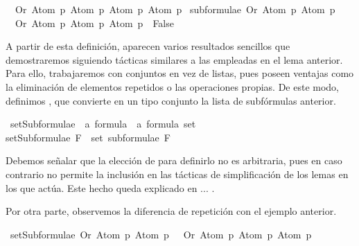 \begin{isabellebody}
\ \ {\isacharbrackleft}Or\ {\isacharparenleft}Atom\ p{\isacharparenright}\ {\isacharparenleft}Atom\ p{\isacharparenright}{\isacharcomma}\ Atom\ p{\isacharcomma}\ Atom\ p{\isacharbrackright}{\isachardoublequoteclose}\isanewline
\isanewline
{}\isamarkupfalse%
\ {\isachardoublequoteopen}subformulae\ {\isacharparenleft}Or\ {\isacharparenleft}Atom\ p{\isacharparenright}\ {\isacharparenleft}Atom\ p{\isacharparenright}{\isacharparenright}\ {\isacharequal}\ \ \isanewline
\ \ {\isacharbrackleft}Or\ {\isacharparenleft}Atom\ p{\isacharparenright}\ {\isacharparenleft}Atom\ p{\isacharparenright}{\isacharcomma}\ Atom\ p{\isacharbrackright}\ {\isacharequal}\ False{\isachardoublequoteclose}%
\begin{isamarkuptext}%
A partir de esta definición, aparecen varios resultados sencillos que demostraremos siguiendo 
tácticas similares a las empleadas en el lema anterior. Para ello, trabajaremos
con conjuntos en vez de listas, pues poseen ventajas como la eliminación de elementos repetidos
o las operaciones propias.
De este modo, definimos , que convierte en un tipo conjunto la lista de 
subfórmulas anterior.%
\end{isamarkuptext}\isamarkuptrue%
\isamarkupfalse%
\ setSubformulae\ {\isacharcolon}{\isacharcolon}\ {\isachardoublequoteopen}{\isacharprime}a\ formula\ {\isasymRightarrow}\ {\isacharprime}a\ formula\ set{\isachardoublequoteclose}\ \isanewline
{\isachardoublequoteopen}setSubformulae\ F\ {\isasymequiv}\ set\ {\isacharparenleft}subformulae\ F{\isacharparenright}{\isachardoublequoteclose}%
\begin{isamarkuptext}%
Debemos señalar que la elección de  para definirlo no es arbitraria,
pues en caso contrario no permite la inclusión en las tácticas de simplificación de los lemas en los
que actúa. Este hecho queda explicado en ... .%
\end{isamarkuptext}\isamarkuptrue%
%
\begin{isamarkuptext}%
Por otra parte, observemos la diferencia de repetición con el ejemplo anterior.%
\end{isamarkuptext}\isamarkuptrue%
\isamarkupfalse%
\ {\isachardoublequoteopen}setSubformulae\ {\isacharparenleft}Or\ {\isacharparenleft}Atom\ p{\isacharparenright}\ {\isacharparenleft}Atom\ p{\isacharparenright}{\isacharparenright}\ {\isacharequal}\ \ {\isacharbraceleft}Or\ {\isacharparenleft}Atom\ p{\isacharparenright}\ {\isacharparenleft}Atom\ p{\isacharparenright}{\isacharcomma}\ Atom\ p{\isacharbraceright}{\isachardoublequoteclose}\isanewline

\end{isabellebody}
